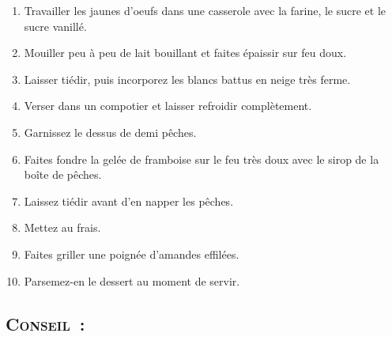 \begin{enumerate}
\item Travailler les jaunes d’oeufs dans une casserole avec la farine, le sucre et le sucre vanill\'e.

\item Mouiller peu \`a peu de lait bouillant et faites \'epaissir sur feu doux.

\item Laisser ti\'edir, puis incorporez les blancs battus en neige tr\`es ferme.

\item Verser dans un compotier et laisser refroidir compl\`etement.

\item Garnissez le dessus de demi p\^eches.

\item Faites fondre la gel\'ee de framboise sur le feu tr\`es doux avec le sirop de la boîte de p\^eches.

\item Laissez ti\'edir avant d’en napper les p\^eches.

\item Mettez au frais.

\item Faites griller une poign\'ee d’amandes effil\'ees.

\item Parsemez-en le dessert au moment de servir.
\end{enumerate}
\subsection*{\textsc{Conseil~:}}
